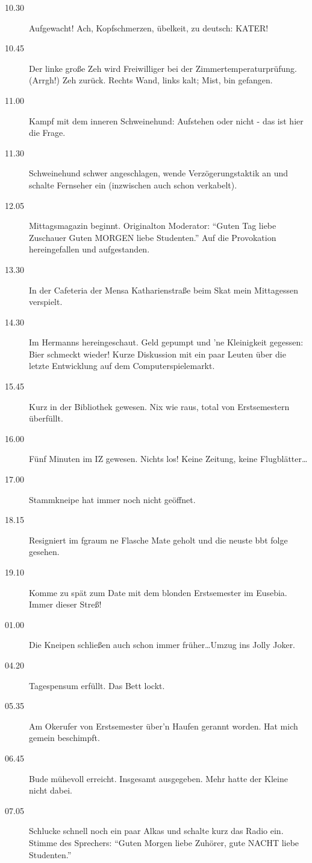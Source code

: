 \begin{description}
\item[10.30] Aufgewacht! Ach, Kopfschmerzen, übelkeit, zu deutsch: KATER!
\item[10.45] Der linke große Zeh wird Freiwilliger bei der Zimmertemperaturprüfung.
(Arrgh!) Zeh zurück. Rechts Wand, links kalt; Mist, bin gefangen.
\item[11.00] Kampf mit dem inneren Schweinehund: Aufstehen oder nicht - das ist
hier die Frage.
\item[11.30] Schweinehund schwer angeschlagen, wende Verzögerungstaktik an und
schalte Fernseher ein (inzwischen auch schon verkabelt).
\item[12.05] Mittagsmagazin beginnt. Originalton Moderator: "`Guten Tag liebe
Zuschauer Guten MORGEN liebe Studenten."' Auf die Provokation hereingefallen
und aufgestanden.
\item[13.30] In der Cafeteria der Mensa Katharienstraße beim Skat mein Mittagessen
verspielt.
\item[14.30] Im Hermanns hereingeschaut. Geld gepumpt und 'ne Kleinigkeit
gegessen: Bier schmeckt wieder! Kurze Diskussion mit ein paar Leuten über
die letzte Entwicklung auf dem Computerspielemarkt.
\item[15.45] Kurz in der Bibliothek gewesen. Nix wie raus, total von Erstsemestern
überfüllt.
\item[16.00] Fünf Minuten im IZ gewesen. Nichts los! Keine Zeitung, keine
Flugblätter\ldots
\item[17.00] Stammkneipe hat immer noch nicht geöffnet.
\item[18.15] Resigniert im fgraum ne Flasche Mate geholt und die neuste bbt folge gesehen.
\item[19.10] Komme zu spät zum Date mit dem blonden Erstsemester im Eusebia.
Immer dieser Streß!
\item[01.00] Die Kneipen schließen auch schon immer früher\ldots Umzug ins Jolly Joker.
\item[04.20] Tagespensum erfüllt. Das Bett lockt.
\item[05.35] Am Okerufer von Erstsemester über'n Haufen gerannt worden. Hat mich
gemein beschimpft.
\item[06.45] Bude mühevoll erreicht. Insgesamt  ausgegeben. Mehr hatte der
Kleine nicht dabei.
\item[07.05] Schlucke schnell noch ein paar Alkas und schalte kurz das Radio ein.
Stimme des Sprechers: "`Guten Morgen liebe Zuhörer, gute NACHT liebe
Studenten."'
\end{description}
